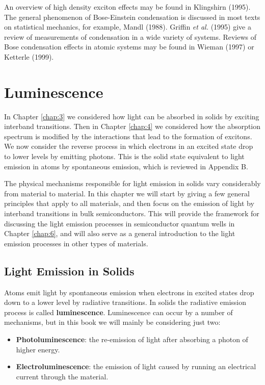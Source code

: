 \documentclass[12pt]{book}
\begin{document}
An overview of high density exciton effects may be found in Klingshirn (1995). The general phenomenon of Bose-Einstein condensation is discussed in most texts on statistical mechanics, for example, Mandl (1988). Griffin \textit{et al.} (1995) give a review of measurements of condensation in a wide variety of systems. Reviews of Bose condensation effects in atomic systems may be found in Wieman (1997) or Ketterle (1999).

\chapter{Luminescence}\label{chap:5}
\begin{shaded}

In Chapter \ref{chap:3} we considered how light can be absorbed in solids by exciting interband transitions. Then in Chapter \ref{chap:4} we considered how the absorption spectrum is modified by the interactions that lead to the formation of excitons. We now consider the reverse process in which electrons in an excited state drop to lower levels by emitting photons. This is the solid state equivalent to light emission in atoms by spontaneous emission, which is reviewed in Appendix B.

The physical mechanisms responsible for light emission in solids vary considerably from material to material. In this chapter we will start by giving a few general principles that apply to all materials, and then focus on the emission of light by interband transitions in bulk semiconductors. This will provide the framework for discussing the light emission processes in semiconductor quantum wells in Chapter \ref{chap:6}, and will also serve as a general introduction to the light emission processes in other types of materials.
\end{shaded}

\section{Light Emission in Solids}
Atoms emit light by spontaneous emission when electrons in excited states drop down to a lower level by radiative transitions. In solids the radiative emission process is called \textbf{luminescence}. Luminescence can occur by a number of mechanisms, but in this book we will mainly be considering just two:
\begin{itemize}
  \item \textbf{Photoluminescence}: the re-emission of light after absorbing a photon of higher energy.
  \item \textbf{Electroluminescence}: the emission of light caused by running an electrical current through the material.
\end{itemize}
\end{document}
